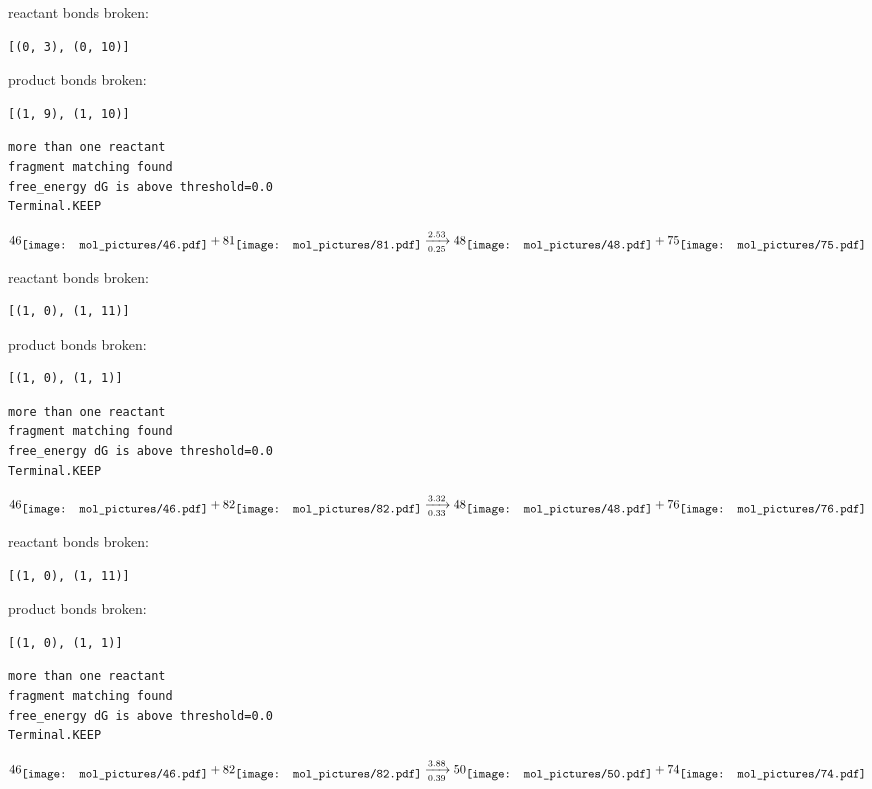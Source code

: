 \documentclass{article}
\begin{document}
reactant bonds broken:\begin{verbatim}
[(0, 3), (0, 10)]
\end{verbatim}
product bonds broken:\begin{verbatim}
[(1, 9), (1, 10)]
\end{verbatim}




\vspace{1cm}
\begin{verbatim}
more than one reactant
fragment matching found
free_energy dG is above threshold=0.0
Terminal.KEEP
\end{verbatim}
$$
46
\raisebox{-.5\height}{\texttt{[image: mol\_pictures/46.pdf]}}
+
81
\raisebox{-.5\height}{\texttt{[image: mol\_pictures/81.pdf]}}
\xrightarrow[0.25]{2.53}
48
\raisebox{-.5\height}{\texttt{[image: mol\_pictures/48.pdf]}}
+
75
\raisebox{-.5\height}{\texttt{[image: mol\_pictures/75.pdf]}}
$$


reactant bonds broken:\begin{verbatim}
[(1, 0), (1, 11)]
\end{verbatim}
product bonds broken:\begin{verbatim}
[(1, 0), (1, 1)]
\end{verbatim}




\vspace{1cm}
\begin{verbatim}
more than one reactant
fragment matching found
free_energy dG is above threshold=0.0
Terminal.KEEP
\end{verbatim}
$$
46
\raisebox{-.5\height}{\texttt{[image: mol\_pictures/46.pdf]}}
+
82
\raisebox{-.5\height}{\texttt{[image: mol\_pictures/82.pdf]}}
\xrightarrow[0.33]{3.32}
48
\raisebox{-.5\height}{\texttt{[image: mol\_pictures/48.pdf]}}
+
76
\raisebox{-.5\height}{\texttt{[image: mol\_pictures/76.pdf]}}
$$


reactant bonds broken:\begin{verbatim}
[(1, 0), (1, 11)]
\end{verbatim}
product bonds broken:\begin{verbatim}
[(1, 0), (1, 1)]
\end{verbatim}




\vspace{1cm}
\begin{verbatim}
more than one reactant
fragment matching found
free_energy dG is above threshold=0.0
Terminal.KEEP
\end{verbatim}
$$
46
\raisebox{-.5\height}{\texttt{[image: mol\_pictures/46.pdf]}}
+
82
\raisebox{-.5\height}{\texttt{[image: mol\_pictures/82.pdf]}}
\xrightarrow[0.39]{3.88}
50
\raisebox{-.5\height}{\texttt{[image: mol\_pictures/50.pdf]}}
+
74
\raisebox{-.5\height}{\texttt{[image: mol\_pictures/74.pdf]}}
$$
\end{document}
